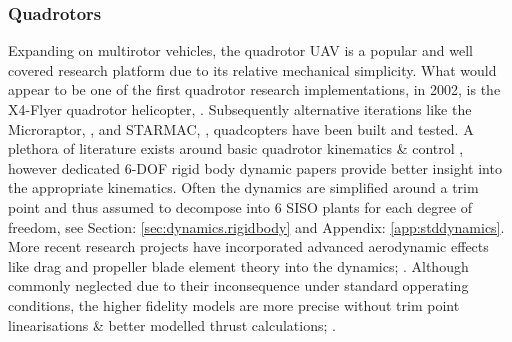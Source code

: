 \subsubsection*{Quadrotors}
Expanding on multirotor vehicles, the quadrotor UAV is a popular and well covered research platform due to its relative mechanical simplicity. What would appear to be one of the first quadrotor research implementations, in 2002, is the X4-Flyer quadrotor helicopter, \cite{x4flyer,x4flyercontrol}. Subsequently alternative iterations like the Microraptor, \cite{microraptor}, and STARMAC, \cite{starmac}, quadcopters have been built and tested. A plethora of literature exists around basic quadrotor kinematics \& control \cite{dynamicmodelling2013, dynamicmodelling2009, modelingquadcopter, quaddynamics, fullquadcoptercontrol}, however dedicated 6-DOF rigid body dynamic papers \cite{rigidbodylecture,eulerrigidbody} provide better insight into the appropriate kinematics. Often the dynamics are simplified around a trim point and thus assumed to decompose into 6 SISO plants for each degree of freedom, see Section: \ref{sec:dynamics.rigidbody} and Appendix: \ref{app:stddynamics}. More recent research projects have incorporated advanced aerodynamic effects like drag and propeller blade element theory into the dynamics; \cite{lowreynolds,bem,starmac}. Although commonly neglected due to their inconsequence under standard opperating conditions, the higher fidelity models are more precise without trim point linearisations \& better modelled thrust calculations; \cite{nonlineardynamics,starmac}.
\par
